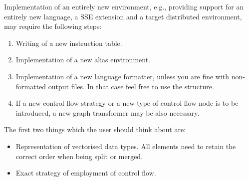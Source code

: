 Implementation of an entirely new environment, e.g., providing support for an entirely new language, a SSE extension and a target distributed environment, may require the following steps:

\begin{enumerate}
  \item Writing of a new instruction table.
  \item Implementation of a new alias environment. 
  \item Implementation of a new language formatter, unless you are fine with non-formatted output files. In that case feel free to use the  structure.
  \item If a new control flow strategy or a new type of control flow node is to be introduced, a new graph transformer may be also necessary.
\end{enumerate}

The first two things which the user should think about are:

\begin{itemize}
  \item Representation of vectorised data types. All elements need to retain the correct order when being split or merged.
  \item Exact strategy of employment of control flow.
\end{itemize}







